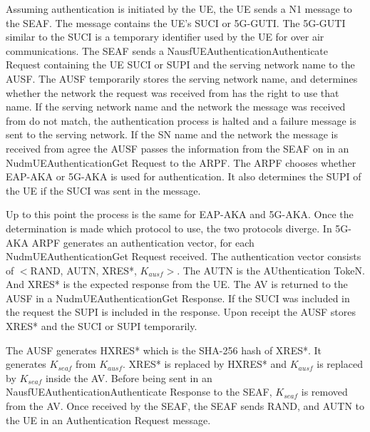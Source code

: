 \documentclass[10pt, pdftex]{article}
\begin{document}
Assuming authentication is initiated by the UE, the UE sends a N1 message to the SEAF. The message contains the UE's SUCI or 5G-GUTI. The 5G-GUTI similar to the SUCI is a temporary identifier used by the UE for over air communications. The SEAF sends a Nausf\textunderscore UEAuthentication\textunderscore Authenticate Request containing the UE SUCI or SUPI and the serving network name to the AUSF. The AUSF temporarily stores the serving network name, and determines whether the network the request was received from has the right to use that name. If the serving network name and the network the message was received from do not match, the authentication process is halted and a failure message is sent to the serving network. If the SN name and the network the message is received from agree the AUSF passes the information from the SEAF on in an Nudm\textunderscore UEAuthentication\textunderscore Get Request to the ARPF. The ARPF chooses whether EAP-AKA or 5G-AKA is used for authentication. It also determines the SUPI of the UE if the SUCI was sent in the message. 

Up to this point the process is the same for EAP-AKA and 5G-AKA. Once the determination is made which protocol to use, the two protocols diverge. In 5G-AKA ARPF generates an authentication vector, for each\\Nudm\textunderscore UEAuthentication\textunderscore Get Request received. The authentication vector consists of $<$RAND, AUTN, XRES*, $K_{ausf}$$>$. The AUTN is the AUthentication TokeN. And XRES* is the expected response from the UE. The AV is returned to the AUSF in a Nudm\textunderscore UEAuthentication\textunderscore Get Response. If the SUCI was included in the request the SUPI is included in the response. Upon receipt the AUSF stores XRES* and the SUCI or SUPI temporarily. 

The AUSF generates HXRES* which is the SHA-256 hash of XRES*. It generates $K_{seaf}$ from $K_{ausf}$. XRES* is replaced by HXRES* and $K_{ausf}$ is replaced by $K_{seaf}$ inside the AV. Before being sent in an\\Nausf\textunderscore UEAuthentication\textunderscore Authenticate Response to the SEAF, $K_{seaf}$ is removed from the AV. Once received by the SEAF, the SEAF sends RAND, and AUTN to the UE in an Authentication Request message. 
\end{document}
